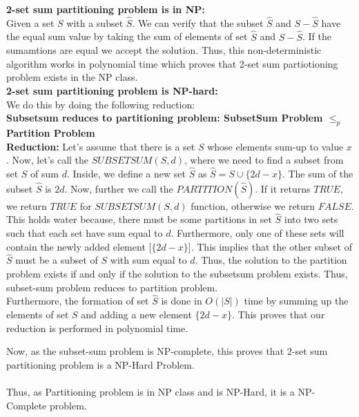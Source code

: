 \documentclass{article}
\begin{document}
\textbf{2-set sum partitioning problem is in NP:}\\
Given a set $S$ with a subset $\hat{S}$. We can verify that the subset $\hat{S}$ and $S-\hat{S}$ have the equal sum value by taking the sum of elements of set $\hat{S}$ and $S-\hat{S}$. If the sumamtions are equal we accept the solution. Thus, this non-deterministic algorithm works in polynomial time which proves that 2-set sum partiotioning problem exists in the NP class.\\
\textbf{2-set sum partitioning problem is NP-hard:}\\
We do this by doing the following reduction:\\
\textbf{Subsetsum reduces to partitioning problem: SubsetSum Problem $\leq_p$ Partition Problem}\\
\textbf{Reduction: }
Let's assume that there is a set $S$ whose elements sum-up to value $x$. Now, let's call the $SUBSETSUM(S,d)$, where we need to find a subset from set $S$ of sum $d$. Inside, we define a new set $\hat{S}$ as $\hat{S}=S\cup\{2d-x\}$. The sum of the subset $\hat{S}$ is $2d$. Now, further we call the $PARTITION(\hat{S})$. If it returns $TRUE$, we return $TRUE$ for $SUBSETSUM(S,d)$ function, otherwise we return $FALSE$.\\ This holds water because, there must be some partitions in set $\hat{S}$ into two sets such that each set have sum equal to $d$. Furthermore, only one of these sets will contain the newly added element [$\{2d-x\}$]. This implies that the other subset of $\hat{S}$ must be a subset of $S$ with sum equal to $d$. Thus, the solution to the partition problem exists if and only if the solution to the subsetsum problem exists.
Thus, subset-sum problem reduces to partition problem.\\

Furthermore, the formation of set $\hat{S}$ is done in $O(|S|)$ time by summing up the elements of set $S$ and adding a new element $\{2d-x\}$. This proves that our reduction is performed in polynomial time.

Now, as the subset-sum problem is NP-complete, this proves that 2-set sum partitioning problem is a NP-Hard Problem. \\\\

Thus, as Partitioning problem is in NP class and is NP-Hard, it is a NP-Complete problem.
\end{document}
